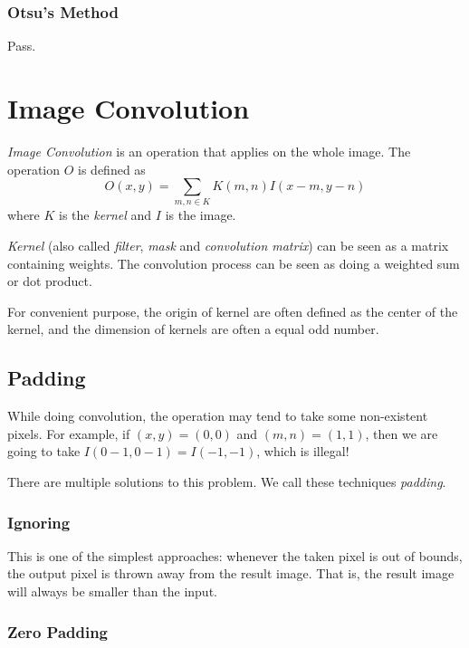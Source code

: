\documentclass{note}
\begin{document}
\subsubsection{Otsu's Method}

Pass.

\section{Image Convolution}

\textit{Image Convolution} is an operation that applies on the whole image. The operation $O$ is defined as
\begin{equation*}
    O(x, y) = \sum_{m, n \in K} K(m, n) I(x-m, y-n)
\end{equation*}
where $K$ is the \textit{kernel} and $I$ is the image. 

\textit{Kernel} (also called \textit{filter}, \textit{mask} and \textit{convolution matrix}) can be seen as a matrix containing weights. The convolution process can be seen as doing a weighted sum or dot product.

\begin{important}
    For convenient purpose, the origin of kernel are often defined as the center of the kernel, and the dimension of kernels are often a equal odd number.
\end{important}

\subsection{Padding}

While doing convolution, the operation may tend to take some non-existent pixels. For example, if $(x, y) = (0, 0)$ and $(m, n) = (1, 1)$, then we are going to take $I(0-1, 0-1) = I(-1, -1)$, which is illegal! 

There are multiple solutions to this problem. We call these techniques \textit{padding}.

\subsubsection{Ignoring}

This is one of the simplest approaches: whenever the taken pixel is out of bounds, the output pixel is thrown away from the result image. That is, the result image will always be smaller than the input. 

\subsubsection{Zero Padding}
\end{document}
